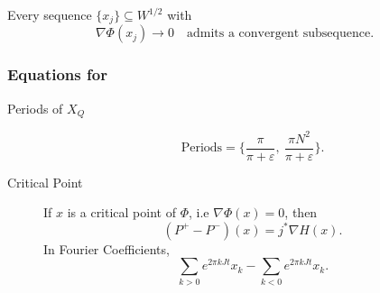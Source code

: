 \documentclass[../main-v2-manifolds.tex]{subfiles}
\begin{document}
\begin{wts}\label{thm:phi satisfies ps}
    Every sequence $\{x_j\}\subseteq W^{1/2}$ with
    \[
        \nabla \Phi(x_j)\to 0\quad\text{admits a convergent subsequence.}
    \]
\end{wts}
\subsubsection*{Equations for }
\begin{description}
    \item[Periods of $X_{Q}$]
    \[
        \text{Periods} = \{\dfrac{\pi}{\pi + \varepsilon},\ \dfrac{\pi N^2}{\pi +\varepsilon}\}.
    \]
    \item[Critical Point]
    If $x$ is a critical point of $\Phi$, i.e $\nabla\Phi(x) = 0$, then
    \[
        (P^+ - P^-)(x) = j^*\nabla H(x).
    \]
    In Fourier Coefficients,
    \[
        \sum_{k>0}e^{2\pi kJt}x_k - \sum_{k<0}e^{2\pi kJt}x_k.
    \]
\end{description}
\end{document}
